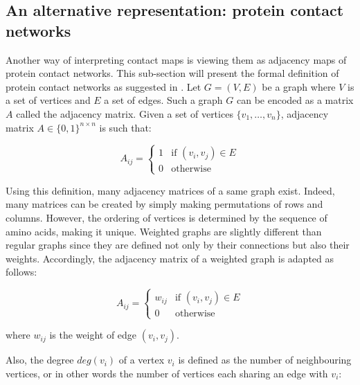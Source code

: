     \subsection{An alternative representation: protein contact networks} \label{pcn}

        Another way of interpreting contact maps is viewing them as adjacency maps of protein contact networks.
        This sub-section will present the formal definition of protein contact
        networks as suggested in \cite{doi:10.1021/cr3002356}.
        Let $G = (V, E)$ be a graph where $V$ is a set of vertices and $E$ a set of edges.
        Such a graph $G$ can be encoded as a matrix $A$ called
        the adjacency matrix. Given a set of vertices $\{ v_1, \ldots, v_n \}$,
        adjacency matrix $A \in \{ 0, 1 \}^{n \times n}$ is such that:

        \begin{equation}
            A_{ij} =
                \begin{cases}
                    1 & \text{if } (v_i, v_j) \in E \\
                    0 & \text{otherwise}
                \end{cases}
        \end{equation}

        Using this definition, many adjacency matrices of a same graph exist.
        Indeed, many matrices can be created by simply
        making permutations of rows and columns. However, the ordering of vertices is determined by the sequence
        of amino acids, making it unique.
        Weighted graphs are slightly different than regular graphs since they are defined not only by their connections but also their weights.
        Accordingly, the adjacency matrix of a weighted graph is adapted as follows:

        \begin{equation}
            A_{ij} =
                \begin{cases}
                    w_{ij} & \text{if } (v_i, v_j) \in E \\
                    0 & \text{otherwise}
                \end{cases}
        \end{equation}

        where $w_{ij}$ is the weight of edge $(v_i, v_j)$.

        Also, the degree $deg(v_i)$ of a vertex $v_i$ is defined as the number of neighbouring vertices, or in other
        words the number of vertices each sharing an edge with $v_i$:

